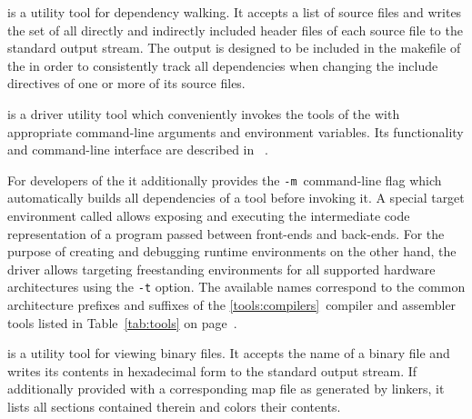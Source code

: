  is a utility tool for dependency walking.
It accepts a list of \cpp{} source files and writes the set of all directly and indirectly included header files of each source file to the standard output stream.
The output is designed to be included in the makefile of the \ecs{} in order to consistently track all dependencies when changing the include directives of one or more of its source files.


 is a driver utility tool which conveniently invokes the tools of the \ecs{} with appropriate command-line arguments and environment variables.
Its functionality and command-line interface are described in \Documentation{}~.


For developers of the \ecs{} it additionally provides the \texttt{-m}~command-line flag which automatically builds all dependencies of a tool before invoking it.
A special target environment called  allows exposing and executing the intermediate code representation of a program passed between front-ends and back-ends.
For the purpose of creating and debugging runtime environments on the other hand, the driver allows targeting freestanding environments for all supported hardware architectures using the \texttt{-t} option.
\ifbook The available names correspond to the common architecture prefixes and suffixes of the \ref*{tools:compilers}~compiler and assembler tools listed in Table~\ref{tab:tools} on page~\pageref{tab:tools}. \fi

 is a utility tool for viewing binary files.
It accepts the name of a binary file and writes its contents in hexadecimal form to the standard output stream.
If additionally provided with a corresponding map file as generated by linkers, it lists all sections contained therein and colors their contents.


